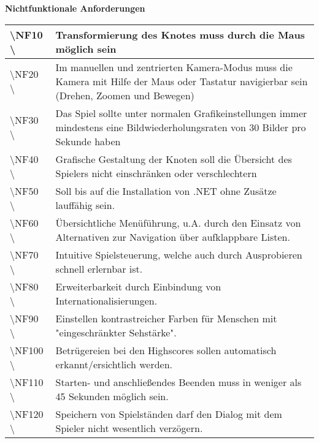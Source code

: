 \documentclass[10pt]{article}
\begin{document}
\newpage
\textbf{Nichtfunktionale Anforderungen}\\
\begin{tabular}{|p{}|p{}|}
\hline 
\textbackslash NF10  \textbackslash & Transformierung des Knotes muss durch die Maus möglich sein\\ %
\hline 
\textbackslash NF20  \textbackslash & Im manuellen und zentrierten Kamera-Modus muss die Kamera mit Hilfe der Maus oder Tastatur navigierbar sein (Drehen, Zoomen und Bewegen)\\ %
\hline 
\textbackslash NF30  \textbackslash & Das Spiel sollte unter normalen Grafikeinstellungen immer mindestens eine Bildwiederholungsraten von 30 Bilder pro Sekunde haben\\ 
\hline 
\textbackslash NF40  \textbackslash & Grafische Gestaltung der Knoten soll die Übersicht des Spielers nicht einschränken oder verschlechtern\\ 
\hline 
\textbackslash NF50  \textbackslash & Soll bis auf die Installation von .NET ohne Zusätze lauffähig sein.\\ 
\hline 
\textbackslash NF60  \textbackslash & Übersichtliche Menüführung, u.A. durch den Einsatz von Alternativen zur Navigation über aufklappbare Listen.\\ %
\hline 
\textbackslash NF70  \textbackslash & Intuitive Spielsteuerung, welche auch durch Ausprobieren schnell erlernbar ist.\\ 
\hline 
\textbackslash NF80  \textbackslash & Erweiterbarkeit durch Einbindung von Internationalisierungen.\\ %
\hline 
\textbackslash NF90  \textbackslash & Einstellen kontrastreicher Farben für Menschen mit "eingeschränkter Sehstärke".\\ 
\hline
\textbackslash NF100  \textbackslash & Betrügereien bei den Highscores sollen automatisch erkannt/ersichtlich werden.\\ 
\hline 
\textbackslash NF110  \textbackslash & Starten- und anschließendes Beenden muss in weniger als 45 Sekunden möglich sein.\\ %
\hline
\textbackslash NF120  \textbackslash & Speichern von Spielständen darf den Dialog mit dem Spieler nicht wesentlich verzögern.\\ %
\hline
\end{tabular} 
\end{document}
